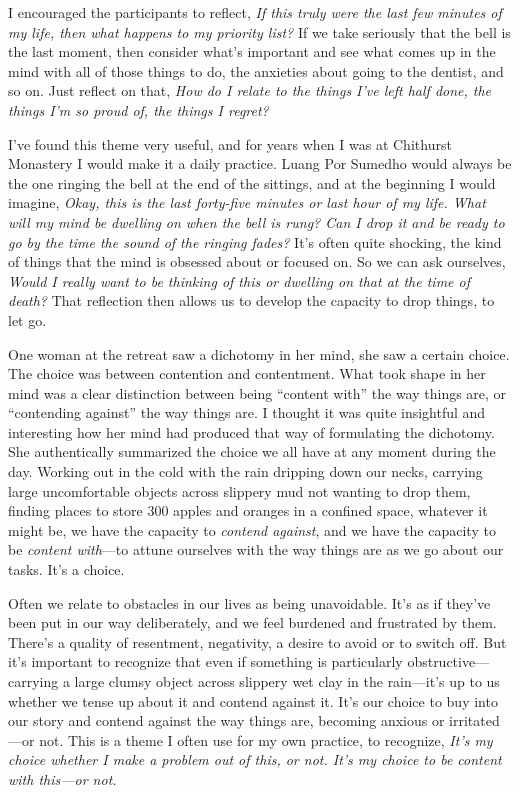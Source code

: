 I encouraged the participants to reflect, \emph{If this truly were the 
last few minutes of my life, then what happens to my priority list?} If 
we take seriously that the bell is the last moment, then consider 
what's important and see what comes up in the mind with all of those 
things to do, the anxieties about going to the dentist, and so on. Just 
reflect on that, \emph{How do I relate to the things I've left half 
done, the things I'm so proud of, the things I regret?}

I've found this theme very useful, and for years when I was at 
Chithurst Monastery I would make it a daily practice. Luang Por Sumedho 
would always be the one ringing the bell at the end of the sittings, 
and at the beginning I would imagine, \emph{Okay, this is the last 
forty-five minutes or last hour of my life. What will my mind be 
dwelling on when the bell is rung? Can I drop it and be ready to go by 
the time the sound of the ringing fades?} It's often quite shocking, 
the kind of things that the mind is obsessed about or focused on. So we 
can ask ourselves, \emph{Would I really want to be thinking of this or 
dwelling on that at the time of death?} That reflection then allows us 
to develop the capacity to drop things, to let go.

One woman at the retreat saw a dichotomy in her mind, she saw a certain 
choice. The choice was between contention and contentment. What took 
shape in her mind was a clear distinction between being ``content 
with'' the way things are, or ``contending against'' the way things 
are. I thought it was quite insightful and interesting how her mind had 
produced that way of formulating the dichotomy. She authentically 
summarized the choice we all have at any moment during the day. Working 
out in the cold with the rain dripping down our necks, carrying large 
uncomfortable objects across slippery mud not wanting to drop them, 
finding places to store 300 apples and oranges in a confined space, 
whatever it might be, we have the capacity to \emph{contend against}, 
and we have the capacity to be \emph{content with}---to attune 
ourselves with the way things are as we go about our tasks. It's a 
choice.

Often we relate to obstacles in our lives as being unavoidable. It's as 
if they've been put in our way deliberately, and we feel burdened and 
frustrated by them. There's a quality of resentment, negativity, a 
desire to avoid or to switch off. But it's important to recognize that 
even if something is particularly obstructive---carrying a large clumsy 
object across slippery wet clay in the rain---it's up to us whether we 
tense up about it and contend against it. It's our choice to buy into 
our story and contend against the way things are, becoming anxious or 
irritated---or not. This is a theme I often use for my own practice, to 
recognize, \emph{It's my choice whether I make a problem out of this, 
or not. It's my choice to be content with this---or not.}


